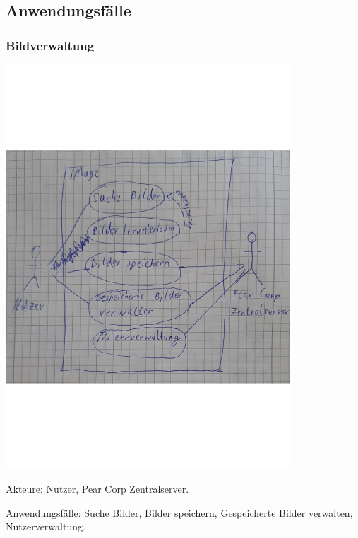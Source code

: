 \documentclass[parskip=full]{scrartcl}
\begin{document}
\subsection{Anwendungsfälle}
\subsubsection{Bildverwaltung}
\begin{center}
\includegraphics[width=0.8\textwidth]{Anwendungsfalldiagramm.pdf}
\end{center}

Akteure: Nutzer, Pear Corp Zentralserver.

Anwendungsfälle: Suche Bilder, Bilder speichern, Gespeicherte Bilder verwalten, Nutzerverwaltung.
\end{document}
